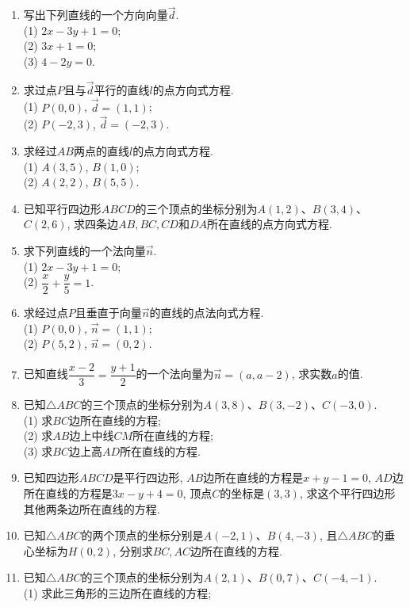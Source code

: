\documentclass[10pt,a4paper]{article}
\begin{document}
\begin{enumerate}[1.]



\item 写出下列直线的一个方向向量$\overrightarrow d$.\\
(1) $2x-3y+1=0$;\\ 
(2) $3x+1=0$;\\
(3) $4-2y=0$.
\item 求过点$P$且与$\overrightarrow d$平行的直线$l$的点方向式方程.\\
(1) $P(0,0)$, $\overrightarrow d=(1,1)$;\\
(2) $P(-2,3)$, $\overrightarrow d=(-2,3)$.
\item 求经过$AB$两点的直线$l$的点方向式方程.\\
(1) $A(3,5)$, $B(1,0)$;\\ 
(2) $A(2,2)$, $B(5,5)$.
\item 已知平行四边形$ABCD$的三个顶点的坐标分别为$A(1,2)$、$B(3,4)$、$C(2,6)$, 求四条边$AB,BC,CD$和$DA$所在直线的点方向式方程.
\item 求下列直线的一个法向量$\overrightarrow n$.\\
(1) $2x-3y+1=0$;\\
(2) $\dfrac x2+\dfrac y5=1$.
\item 求经过点$P$且垂直于向量$\overrightarrow n$的直线的点法向式方程.\\
(1) $P(0,0)$, $\overrightarrow n=(1,1)$;\\
(2) $P(5,2)$, $\overrightarrow n=(0,2)$.
\item 已知直线$\dfrac{x-2}3=\dfrac{y+1}2$的一个法向量为$\overrightarrow n=(a,a-2)$, 求实数$a$的值.
\item 已知$\triangle ABC$的三个顶点的坐标分别为$A(3,8)$、$B(3,-2)$、$C(-3,0)$.\\
(1) 求$BC$边所在直线的方程;\\
(2) 求$AB$边上中线$CM$所在直线的方程;\\
(3) 求$BC$边上高$AD$所在直线的方程.
\item 已知四边形$ABCD$是平行四边形, $AB$边所在直线的方程是$x+y-1=0$, $AD$边所在直线的方程是$3x-y+4=0$, 顶点$C$的坐标是$(3,3)$, 求这个平行四边形其他两条边所在直线的方程.
\item 已知$\triangle ABC$的两个顶点的坐标分别是$A(-2,1)$、$B(4,-3)$, 且$\triangle ABC$的垂心坐标为$H(0,2)$, 分别求$BC,AC$边所在直线的方程.
\item 已知$\triangle ABC$的三个顶点的坐标分别为$A(2,1)$、$B(0,7)$、$C(-4,-1)$.\\
(1) 求此三角形的三边所在直线的方程;\\

\end{enumerate}
\end{document}
